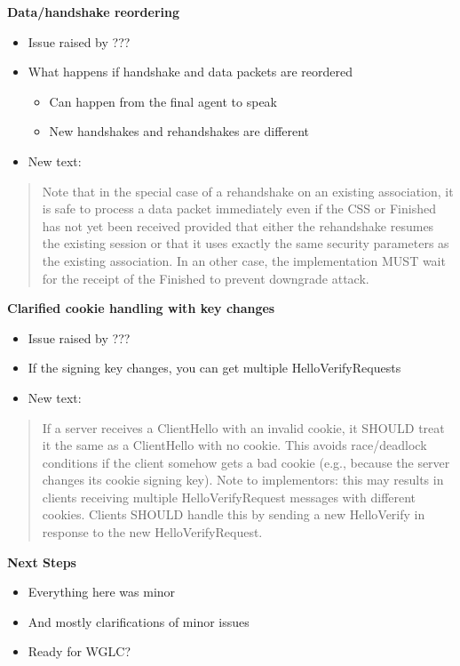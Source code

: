 \documentclass[helvetica]{seminar}
\newcommand{\heading}[1]{%
  \begin{center} 
    \large\bf 
    #1 
  \end{center} 
  \vspace{.4 in}}
\begin{document}
\begin{slide}
\heading{Data/handshake reordering}

\vspace{-.3 in}
\begin{itemize}
\item Issue raised by ???
\item What happens if handshake and data packets are reordered
\begin{itemize}
\item Can happen from the final agent to speak
\item New handshakes and rehandshakes are different
\end{itemize}
\item New text:
\end{itemize}

\begin{quote}
Note that in the special case of a rehandshake on an existing
association, it is safe to process a data packet immediately even if
the CSS or Finished has not yet been received provided that either
the rehandshake resumes the existing session or that it uses exactly
the same security parameters as the existing association.  In an
other case, the implementation MUST wait for the receipt of the
Finished to prevent downgrade attack.
\end{quote}
\end{slide}



\begin{slide}
\heading{Clarified cookie handling with key changes}

\begin{itemize}
\item Issue raised by ???
\item If the signing key changes, you can get multiple \textsf{HelloVerifyRequest}s
\item New text:
\end{itemize}

\begin{quote}
If a server receives a ClientHello with an invalid cookie, it SHOULD
treat it the same as a ClientHello with no cookie. This avoids
race/deadlock conditions if the client somehow gets a bad cookie
(e.g., because the server changes its cookie signing key). Note to
implementors: this may results in clients receiving multiple
HelloVerifyRequest messages with different cookies.  Clients SHOULD
handle this by sending a new HelloVerify in response to the new
HelloVerifyRequest.
\end{quote}

\end{slide}



\begin{slide}
\heading{Next Steps}

\begin{itemize}
\item Everything here was minor
\item And mostly clarifications of minor issues
\item Ready for WGLC?
\end{itemize}

\end{slide}
\end{document}
